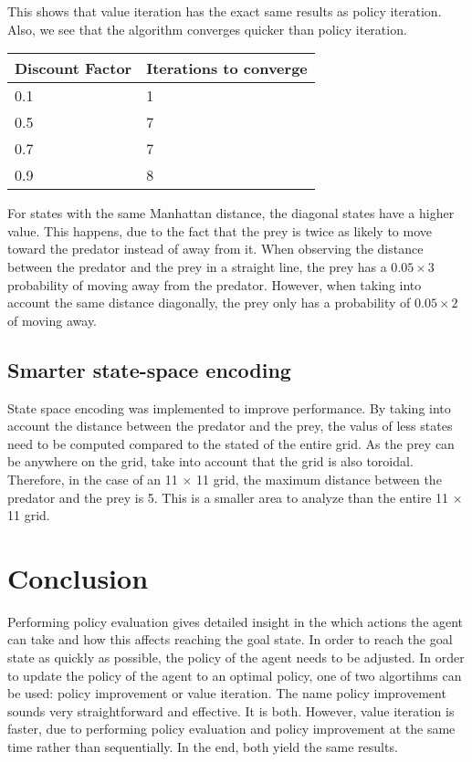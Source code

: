 \documentclass{article}
\begin{document}
This shows that value iteration has the exact same results as policy iteration. Also, we see that the algorithm converges quicker than policy iteration.

\begin{center}
	\begin{tabular}{ l || l }
		Discount Factor & Iterations to converge \\ 
		\hline
		0.1 & 1 \\
		0.5 & 7 \\
		0.7 & 7 \\
		0.9 & 8 \\	
	\end{tabular}
\end{center}



For states with the same Manhattan distance, the diagonal states have a higher value. This happens, due to the fact that the prey is twice as likely to move toward the predator instead of away from it. When observing the distance between the predator and the prey in a straight line, the prey has a $0.05 \times 3$ probability of moving away from the predator. However, when taking into account the same distance diagonally, the prey only has a probability of $0.05 \times 2$ of moving away.

\subsection*{Smarter state-space encoding}
State space encoding was implemented to improve performance. By taking into account the distance between the predator and the prey, the valus of less states need to be computed compared to the stated of the entire grid. As the prey can be anywhere on the grid, take into account that the grid is also toroidal. Therefore, in the case of an 11 $\times$ 11 grid, the maximum distance between the predator and the prey is 5. This is a smaller area to analyze than the entire 11 $\times$ 11 grid.


\section*{Conclusion}
Performing policy evaluation gives detailed insight in the which actions the agent can take and how this affects reaching the goal state. In order to reach the goal state as quickly as possible, the policy of the agent needs to be adjusted. In order to update the policy of the agent to an optimal policy, one of two algortihms can be used: policy improvement or value iteration. The name policy improvement sounds very straightforward and effective. It is both. However, value iteration is faster, due to performing policy evaluation and policy improvement at the same time rather than sequentially. In the end, both yield the same results.
\end{document}
